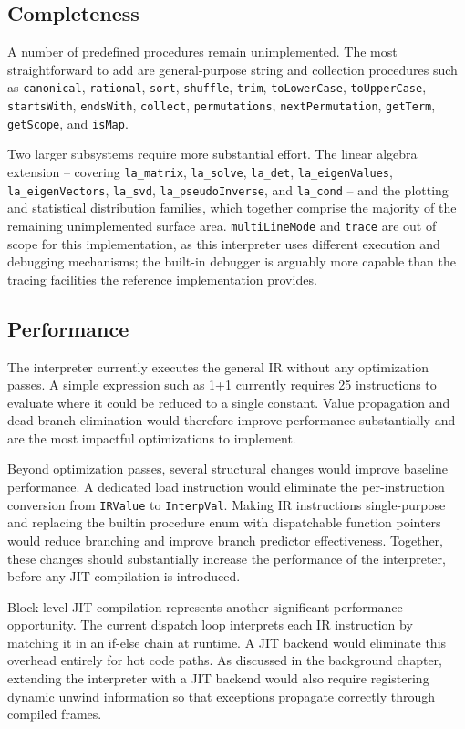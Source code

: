 \subsection{Completeness}

A number of predefined procedures remain unimplemented. The most straightforward to add are general-purpose string and collection procedures such as \texttt{canonical}, \texttt{rational}, \texttt{sort}, \texttt{shuffle}, \texttt{trim}, \texttt{toLowerCase}, \texttt{toUpperCase}, \texttt{startsWith}, \texttt{endsWith}, \texttt{collect}, \texttt{permutations}, \texttt{nextPermutation}, \texttt{getTerm}, \texttt{getScope}, and \texttt{isMap}.

Two larger subsystems require more substantial effort. The linear algebra extension -- covering \texttt{la\_matrix}, \texttt{la\_solve}, \texttt{la\_det}, \texttt{la\_eigenValues}, \texttt{la\_eigenVectors}, \texttt{la\_svd}, \texttt{la\_pseudoInverse}, and \texttt{la\_cond} -- and the plotting and statistical distribution families, which together comprise the majority of the remaining unimplemented surface area. \texttt{multiLineMode} and \texttt{trace} are out of scope for this implementation, as this interpreter uses different execution and debugging mechanisms; the built-in debugger is arguably more capable than the tracing facilities the reference implementation provides.

\subsection{Performance}

The interpreter currently executes the general \ac{IR} without any optimization passes. A simple expression such as 1+1 currently requires 25 instructions to evaluate where it could be reduced to a single constant. Value propagation and dead branch elimination would therefore improve performance substantially and are the most impactful optimizations to implement.

Beyond optimization passes, several structural changes would improve baseline performance. A dedicated load instruction would eliminate the per-instruction conversion from \texttt{IRValue} to \texttt{InterpVal}. Making \ac{IR} instructions single-purpose and replacing the builtin procedure enum with dispatchable function pointers would reduce branching and improve branch predictor effectiveness. Together, these changes should substantially increase the performance of the interpreter, before any \ac{JIT} compilation is introduced.

Block-level \ac{JIT} compilation represents another significant performance opportunity. The current dispatch loop interprets each \ac{IR} instruction by matching it in an if-else chain at runtime. A \ac{JIT} backend would eliminate this overhead entirely for hot code paths. As discussed in the background chapter, extending the interpreter with a \ac{JIT} backend would also require registering dynamic unwind information so that exceptions propagate correctly through compiled frames.
